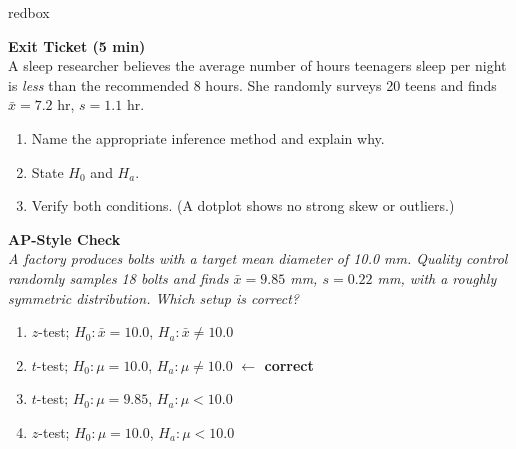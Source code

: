 \documentclass[10pt]{article}
\begin{document}
\begin{skillbox}{redbox}
\begin{minipage}[t]{0.48\linewidth}
    \textbf{Exit Ticket (5 min)}\\
    A sleep researcher believes the average number of hours teenagers sleep per night is
    \emph{less} than the recommended 8 hours. She randomly surveys 20 teens and finds
    $\bar x = 7.2$ hr, $s = 1.1$ hr.
    \begin{enumerate}
        \item Name the appropriate inference method and explain why.
        \item State $H_0$ and $H_a$.
        \item Verify both conditions. (A dotplot shows no strong skew or outliers.)
    \end{enumerate}
\end{minipage}
\hfill
\begin{minipage}[t]{0.48\linewidth}
    \textbf{AP-Style Check}\\
    \textit{A factory produces bolts with a target mean diameter of 10.0 mm. Quality control
    randomly samples 18 bolts and finds $\bar x = 9.85$ mm, $s = 0.22$ mm, with a roughly
    symmetric distribution. Which setup is correct?}
    \begin{enumerate}[label=(\Alph*)]
        \item $z$-test; $H_0: \bar x = 10.0$, $H_a: \bar x \ne 10.0$
        \item $t$-test; $H_0: \mu = 10.0$, $H_a: \mu \ne 10.0$ \textcolor{keyred}{\textbf{$\leftarrow$ correct}}
        \item $t$-test; $H_0: \mu = 9.85$, $H_a: \mu < 10.0$
        \item $z$-test; $H_0: \mu = 10.0$, $H_a: \mu < 10.0$
    \end{enumerate}
\end{minipage}
\end{skillbox}
\end{document}
